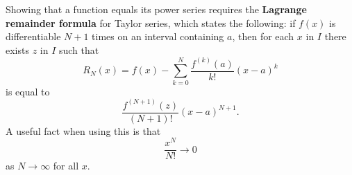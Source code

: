 \documentclass[10pt,]{book}
\newcommand{\terminology}[1]{\textbf{#1}}
\numberwithin{equation}{section}
\begin{document}
\hypertarget{p-970}{}%
Showing that a function equals its power series requires the \terminology{Lagrange remainder formula} for Taylor series, which states the following: if \(f(x)\) is differentiable \(N+1\) times on an interval containing \(a\), then for each \(x\) in \(I\) there exists \(z\) in \(I\) such that%
\begin{equation*}
R_{N}(x) = f(x) - \sum_{k=0}^{N}\frac{f^{(k)}(a)}{k!}(x - a)^{k}
\end{equation*}
is equal to%
\begin{equation*}
\frac{f^{(N+1)}(z)}{(N+1)!}(x - a)^{N+1}\text{.}
\end{equation*}
A useful fact when using this is that%
\begin{equation*}
\frac{x^{N}}{N!}\to0
\end{equation*}
as \(N\to\infty\) for all \(x\).%
\end{document}
